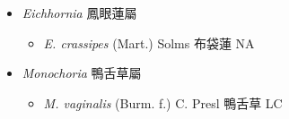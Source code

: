
  \begin{itemize}
 \item[] \textit{Eichhornia} 鳳眼蓮屬
                                
  \begin{itemize}
        \item[] \textit{E. crassipes} (Mart.) Solms  布袋蓮   NA
  \end{itemize}
 \item[] \textit{Monochoria} 鴨舌草屬
                                
  \begin{itemize}
        \item[] \textit{M. vaginalis} (Burm. f.) C. Presl  鴨舌草   LC
  \end{itemize}
  \end{itemize}
